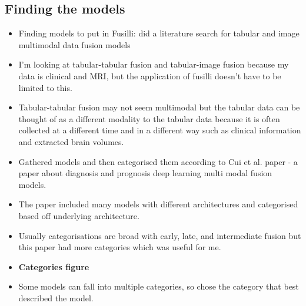\subsection{Finding the models}
\begin{itemize}
    \item Finding models to put in Fusilli: did a literature search for tabular and image multimodal data fusion models
    \item I'm looking at tabular-tabular fusion and tabular-image fusion because my data is clinical and MRI, but the application of fusilli doesn't have to be limited to this.
    \item Tabular-tabular fusion may not seem multimodal but the tabular data can be thought of as a different modality to the tabular data because it is often collected at a different time and in a different way such as clinical information and extracted brain volumes.
    \item Gathered models and then categorised them according to Cui et al. paper - a paper about diagnosis and prognosis deep learning multi modal fusion models.
    \item The paper included many models with different architectures and categorised based off underlying architecture.
    \item Usually categorisations are broad with early, late, and intermediate fusion but this paper had more categories which was useful for me.
    \item \textbf{Categories figure}
    \item Some models can fall into multiple categories, so chose the category that best described the model.
\end{itemize}

